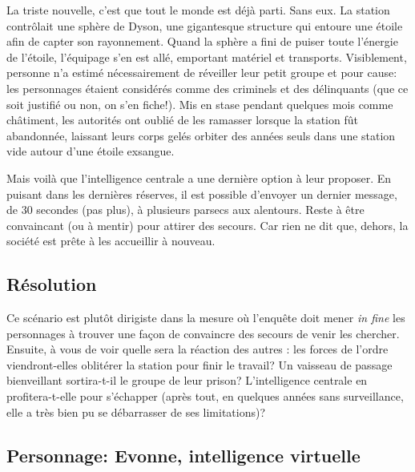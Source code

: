 La triste nouvelle, c'est que tout le monde est déjà parti. Sans eux.
La station contrôlait une sphère de Dyson, une gigantesque structure qui entoure une étoile afin de capter son rayonnement.
Quand la sphère a fini de puiser toute l'énergie de l'étoile, l'équipage s'en est allé, emportant matériel et transports.
Visiblement, personne n'a estimé nécessairement de réveiller leur petit groupe et pour cause: les personnages étaient considérés comme des criminels et des délinquants (que ce soit justifié ou non, on s'en fiche!).
Mis en stase pendant quelques mois comme châtiment, les autorités ont \og oublié \fg de les ramasser lorsque la station fût abandonnée, laissant leurs corps gelés orbiter des années seuls dans une station vide autour d'une étoile exsangue.

Mais voilà que l'intelligence centrale a une dernière option à leur proposer.
En puisant dans les dernières réserves, il est possible d'envoyer un dernier message, de 30 secondes (pas plus), à plusieurs parsecs aux alentours.
Reste à être convaincant (ou à mentir) pour attirer des secours.
Car rien ne dit que, dehors, la société est prête à les accueillir à nouveau.

\subsection{Résolution}

Ce scénario est plutôt dirigiste dans la mesure où l'enquête doit mener \emph{in fine} les personnages à trouver une façon de convaincre des secours de venir les chercher.
Ensuite, à vous de voir quelle sera la réaction des \og autres \og: les forces de l'ordre viendront-elles oblitérer la station pour finir le travail? Un vaisseau de passage bienveillant sortira-t-il le groupe de leur prison? L'intelligence centrale en profitera-t-elle pour s'échapper (après tout, en quelques années sans surveillance, elle a très bien pu se débarrasser de ses limitations)?

\subsection{Personnage: Evonne, intelligence virtuelle}



